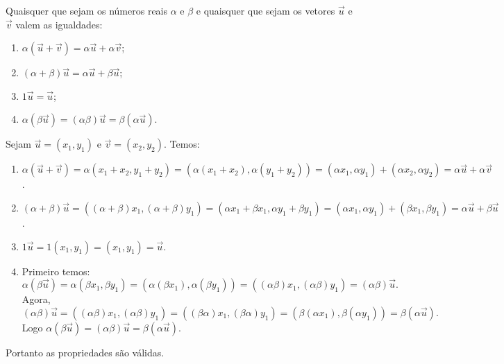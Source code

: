 \begin{propriedades}
  Quaisquer que sejam os números reais $\alpha$ e $\beta$ e quaisquer que sejam os vetores $\vec{u}$ e $\vec{v}$ valem as igualdades:
  \begin{enumerate}[label=({\roman*})]
    \item $\alpha(\vec{u} + \vec{v}) = \alpha\vec{u} + \alpha\vec{v}$;
    \item $(\alpha + \beta)\vec{u} = \alpha\vec{u} + \beta\vec{u}$;
    \item $1\vec{u} = \vec{u}$;
    \item $\alpha(\beta\vec{u}) = (\alpha\beta)\vec{u} = \beta(\alpha\vec{u})$.
  \end{enumerate}
\end{propriedades}
\begin{prova}
    Sejam $\vec{u} = (x_1,y_1)$ e $\vec{v} = (x_2,y_2)$. Temos:
    \begin{enumerate}[label=({\roman*})]
        \item $\alpha(\vec{u} + \vec{v}) = \alpha(x_1+x_2,y_1+y_2) = (\alpha(x_1+x_2),\alpha(y_1+y_2)) = (\alpha x_1,\alpha y_1) + (\alpha x_2,\alpha y_2) =  \alpha\vec{u} + \alpha\vec{v}$.
        \item $(\alpha + \beta)\vec{u} = ((\alpha+\beta)x_1,(\alpha+\beta)y_1) = (\alpha x_1 + \beta x_1, \alpha y_1 + \beta y_1) = (\alpha x_1,\alpha y_1) + (\beta x_1,\beta y_1) = \alpha\vec{u} + \beta\vec{u}$.
        \item $1\vec{u} = 1(x_1,y_1) = (x_1,y_1) = \vec{u}$.
        \item Primeiro temos:
        \[
            \alpha(\beta\vec{u}) = \alpha(\beta x_1,\beta y_1) = (\alpha(\beta x_1),\alpha(\beta y_1)) = ((\alpha\beta)x_1,(\alpha\beta)y_1) = (\alpha\beta)\vec{u}.
        \]
        Agora,
        \[
            (\alpha\beta)\vec{u} =     ((\alpha\beta)x_1,(\alpha\beta)y_1) = ((\beta\alpha)x_1,(\beta\alpha)y_1) = (\beta(\alpha x_1),\beta(\alpha y_1)) = \beta(\alpha\vec{u}).
        \]
        Logo $\alpha(\beta\vec{u}) = (\alpha\beta)\vec{u} = \beta(\alpha\vec{u})$.
    \end{enumerate}
    Portanto as propriedades são válidas.
\end{prova}


